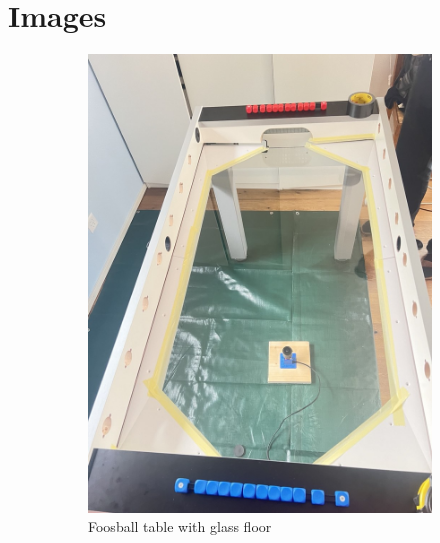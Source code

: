 \section{Images}\label{sec:images}
\begin{figure}[H]
    \centering
    \begin{subfigure}{.5\textwidth}
        \centering
        \includegraphics[width=0.9\linewidth]{../photos/glass_table}
        \caption{Foosball table with glass floor}
        \label{fig:glass_table}
    \end{subfigure}%
    \begin{subfigure}{.5\textwidth}
        \centering

\end{subfigure}
\end{figure}
